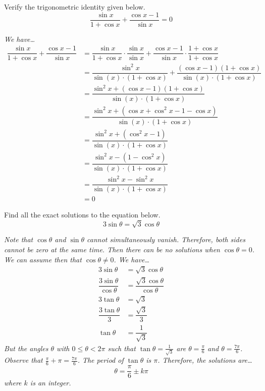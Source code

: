 \documentclass[12pt,letterpaper]{exam}
\begin{document}
\begin{questions}
\newpage
\question[10] Verify the trigonometric identity given below.
	\[
	\dfrac{\sin x}{1 + \cos x} + \dfrac{\cos x - 1}{\sin x}= 0 
	\] \pspace

{\itshape \sol We have\dots
	\[
	\begin{aligned}
	\dfrac{\sin x}{1 + \cos x} + \dfrac{\cos x - 1}{\sin x}&= \dfrac{\sin x}{1 + \cos x} \cdot \dfrac{\sin x}{\sin x} + \dfrac{\cos x - 1}{\sin x} \cdot \dfrac{1 + \cos x}{1 + \cos x} \\[0.3cm]
	&= \dfrac{\sin^2 x}{\sin(x) \cdot (1 + \cos x)} + \dfrac{(\cos x - 1)(1 + \cos x)}{\sin(x) \cdot (1 + \cos x)} \\[0.3cm]
	&= \dfrac{\sin^2 x + (\cos x - 1)(1 + \cos x)}{\sin(x) \cdot (1 + \cos x)} \\[0.3cm]
	&= \dfrac{\sin^2 x + (\cos x + \cos^2 x - 1 - \cos x)}{\sin(x) \cdot (1 + \cos x)} \\[0.3cm]
	&= \dfrac{\sin^2 x + (\cos^2 x - 1)}{\sin(x) \cdot (1 + \cos x)} \\[0.3cm]
	&= \dfrac{\sin^2 x - (1 - \cos^2 x)}{\sin(x) \cdot (1 + \cos x)} \\[0.3cm]
	&= \dfrac{\sin^2 x - \sin^2 x}{\sin(x) \cdot (1 + \cos x)} \\[0.3cm]
	&= 0
	\end{aligned}
	\]
}



\newpage
\question[10] Find all the exact solutions to the equation below.
	\[
	3\sin \theta= \sqrt{3} \cos \theta
	\] \pspace

{\itshape \sol Note that $\cos \theta$ and $\sin \theta$ cannot simultaneously vanish. Therefore, both sides cannot be zero at the same time. Then there can be no solutions when $\cos \theta= 0$. We can assume then that $\cos \theta \neq 0$. We have\dots
	\[
	\begin{aligned}
	3\sin \theta&= \sqrt{3} \cos \theta \\[0.3cm]
	\dfrac{3\sin \theta}{\cos \theta}&= \dfrac{\sqrt{3} \cos \theta}{\cos \theta} \\[0.3cm]
	3 \tan \theta&= \sqrt{3} \\[0.3cm] 
	\dfrac{3 \tan \theta}{3}&= \dfrac{\sqrt{3}}{3} \\[0.3cm] 
	\tan \theta&= \dfrac{1}{\sqrt{3}} 
	\end{aligned}
	\]
But the angles $\theta$ with $0 \leq \theta < 2\pi$ such that $\tan \theta= \frac{1}{\sqrt{3}}$ are $\theta= \frac{\pi}{6}$ and $\theta= \frac{7\pi}{6}$. Observe that $\frac{\pi}{6} + \pi= \frac{7\pi}{6}$. The period of $\tan \theta$ is $\pi$. Therefore, the solutions are\dots
	\[
	\theta= \dfrac{\pi}{6} \pm k\pi
	\]
where $k$ is an integer. 
}




\end{questions}
\end{document}
